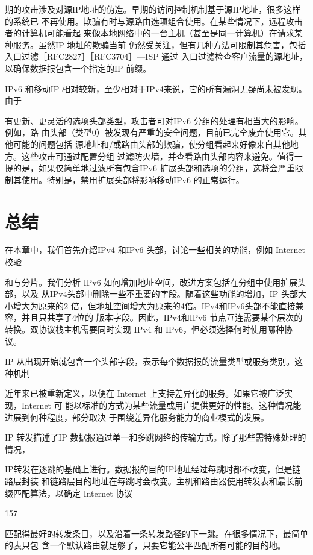 期的攻击涉及对源IP地址的伪造。早期的访问控制机制基于源IP地址，很多这样的系统已
不再使用。欺骗有时与源路由选项组合使用。在某些情况下，远程攻击者的计算机可能看起
来像本地网络中的一台主机（甚至是同一计算机）在请求某种服务。虽然IP 地址的欺骗当前
仍然受关注，但有几种方法可限制其危害，包括入口过滤［RFC2827］［RFC3704］—ISP 通过
入口过滤检查客户流量的源地址，以确保数据报包含一个指定的IP 前缀。

IPv6 和移动IP 相对较新，至少相对于IPv4来说，它的所有漏洞无疑尚未被发现。由于

有更新、更灵活的选项头部类型，攻击者可对IPv6 分组的处理有相当大的影响。例如，路
由头部（类型0）被发现有严重的安全问题，目前已完全废弃使用它。其他可能的问题包括
源地址和/或路由头部的欺骗，使分组看起来好像来自其他地方。这些攻击可通过配置分组
过滤防火墙，并查看路由头部内容来避免。值得一提的是，如果仅简单地过滤所有包含IPv6
扩展头部和选项的分组，这将会严重限制其使用。特别是，禁用扩展头部将影响移动IPv6
的正常运行。

\section{总结}
在本章中，我们首先介绍IPv4 和IPv6 头部，讨论一些相关的功能，例如 Internet 校验

和与分片。我们分析 IPv6 如何增加地址空间，改进方案包括在分组中使用扩展头部，以及
从IPv4头部中删除一些不重要的字段。随着这些功能的增加，IP 头部大小增大为原来的2
倍，但地址空间增大为原来的4倍。IPv4和IPv6头部不能直接兼容，并且只共享了4位的
版本字段。因此，IPv4和IPv6 节点互连需要某个层次的转换。双协议栈主机需要同时实现
IPv4 和 IPv6，但必须选择何时使用哪种协议。

IP 从出现开始就包含一个头部字段，表示每个数据报的流量类型或服务类别。这种机制

近年来已被重新定义，以便在 Internet 上支持差异化的服务。如果它被广泛实现，Internet 可
能以标准的方式为某些流量或用户提供更好的性能。这种情况能进展到何种程度，部分取决
于围绕差异化服务能力的商业模式的发展。

IP 转发描述了IP 数据报通过单一和多跳网络的传输方式。除了那些需特殊处理的情况，

IP转发在逐跳的基础上进行。数据报的目的IP地址经过每跳时都不改变，但是链路层封装
和链路层目的地址在每跳时会改变。主机和路由器使用转发表和最长前缀匹配算法，以确定
Internet 协议

157

匹配得最好的转发条目，以及沿着一条转发路径的下一跳。在很多情况下，最简单的表只包
含一个默认路由就足够了，只要它能公平匹配所有可能的目的地。

